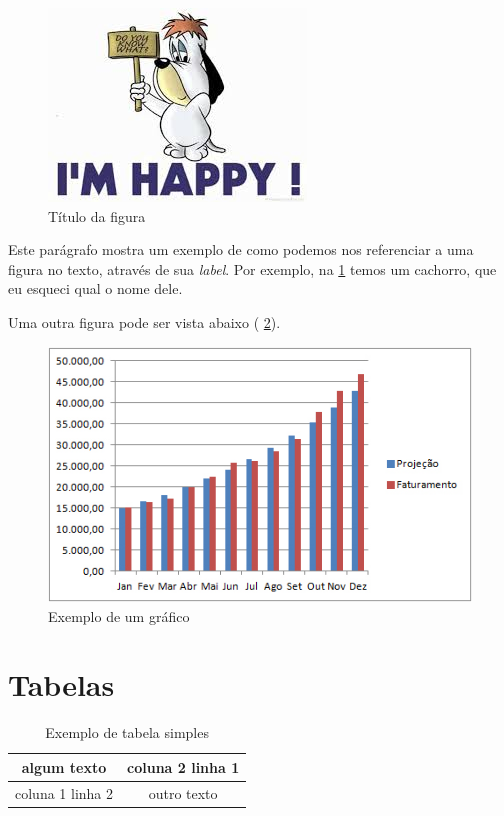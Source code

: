 \documentclass[12pt,a4paper,oneside,titlepage]{report}
\begin{document}
\begin{figure}[!ht]
\centering \includegraphics[scale=0.5]{figuras/droopy.jpg}
\caption{Título da figura}\label{fig:cachorro}
\end{figure}

Este parágrafo mostra um exemplo de como podemos nos referenciar a uma figura no texto, através de sua \textit{label}. Por exemplo, na \figurename{ \ref{fig:cachorro}} temos um cachorro, que eu esqueci qual o nome dele.

Uma outra figura pode ser vista abaixo (\figurename{ \ref{fig:grafico}}).

\begin{figure}[!ht]
\centering \includegraphics[scale=0.5]{figuras/grafico.jpg}
\caption{Exemplo de um gráfico}\label{fig:grafico}
\end{figure}

\lipsum[1-2]

\section{Tabelas}
\lipsum[1-1]

\begin{table}[h!]
\caption{Exemplo de tabela simples}
\begin{center}
\begin{tabular}{|c|c|}
\hline 
algum texto & coluna 2 linha 1 \\ 
\hline 
coluna 1 linha 2 & outro texto \\ 
\hline 
\end{tabular} 
\end{center}
\label{tab:tab1}
\end{table}
\end{document}
